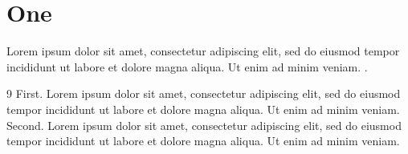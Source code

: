 \documentclass{report}
\begin{document}
\chapter{One}
Lorem ipsum dolor sit amet, consectetur adipiscing elit, sed do eiusmod tempor incididunt ut labore et dolore magna aliqua. Ut enim ad minim veniam. \cite{a}.
\begin{thebibliography}{9}
 First. Lorem ipsum dolor sit amet, consectetur adipiscing elit, sed do eiusmod tempor incididunt ut labore et dolore magna aliqua. Ut enim ad minim veniam.
 Second. Lorem ipsum dolor sit amet, consectetur adipiscing elit, sed do eiusmod tempor incididunt ut labore et dolore magna aliqua. Ut enim ad minim veniam.
\end{thebibliography}
\end{document}
